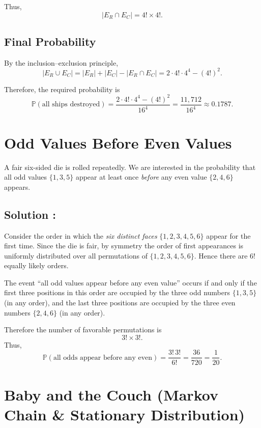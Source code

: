 Thus,
\[
|E_R \cap E_C| = 4! \times 4!.
\]

\subsection*{Final Probability}

By the inclusion--exclusion principle,
\[
|E_R \cup E_C|
= |E_R| + |E_C| - |E_R \cap E_C|
= 2 \cdot 4! \cdot 4^4 - (4!)^2.
\]

Therefore, the required probability is
\[
\boxed{
\mathbb{P}(\text{all ships destroyed})
= \frac{2 \cdot 4! \cdot 4^4 - (4!)^2}{16^4}
= \frac{11,712}{16^4}
\approx 0.1787
}.
\]


\section{Odd Values Before Even Values}


\begin{exerciseBox}

A fair six-sided die is rolled repeatedly. We are interested in the probability that all odd values $\{1,3,5\}$ appear at least once \emph{before} any even value $\{2,4,6\}$ appears.
  
\end{exerciseBox}


\subsection*{Solution :}

Consider the order in which the \emph{six distinct faces} $\{1,2,3,4,5,6\}$ appear for the
first time. Since the die is fair, by symmetry the order of first appearances is uniformly
distributed over all permutations of $\{1,2,3,4,5,6\}$. Hence there are $6!$ equally likely
orders.

The event ``all odd values appear before any even value'' occurs if and only if the first
three positions in this order are occupied by the three odd numbers $\{1,3,5\}$ (in any order),
and the last three positions are occupied by the three even numbers $\{2,4,6\}$ (in any order).

Therefore the number of favorable permutations is
\[
3!\times 3!.
\]
Thus,
\[
\mathbb{P}(\text{all odds appear before any even})
= \frac{3!\,3!}{6!}
= \frac{36}{720}
= \boxed{\frac{1}{20}}.
\]




\section{Baby and the Couch (Markov Chain \& Stationary Distribution)}


